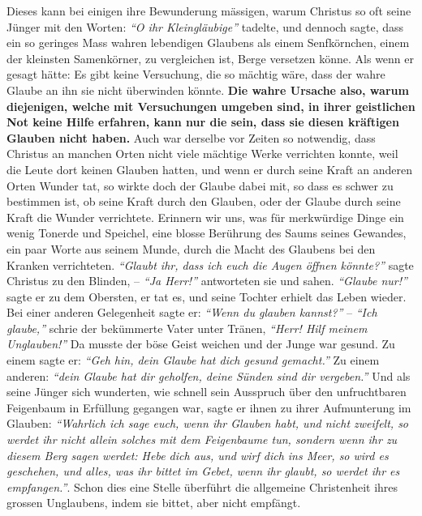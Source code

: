 Dieses kann bei einigen ihre Bewunderung mässigen, warum Christus so oft seine
Jünger mit den Worten:
\textit{"`O ihr Kleingläubige"'} tadelte, und dennoch sagte,
dass ein so geringes Mass wahren lebendigen Glaubens als einem Senfkörnchen,
einem der kleinsten Samenkörner, zu vergleichen ist, Berge versetzen könne. Als
wenn er gesagt hätte: Es gibt keine Versuchung, die so mächtig wäre, dass der
wahre Glaube an ihn sie nicht überwinden könnte. \textbf{Die wahre Ursache also,
warum
diejenigen, welche mit Versuchungen umgeben sind, in ihrer geistlichen Not
keine Hilfe erfahren, kann nur die sein, dass sie diesen kräftigen Glauben nicht
haben.} Auch war derselbe vor Zeiten so notwendig,
dass Christus an manchen
Orten nicht viele mächtige Werke verrichten konnte, weil die Leute dort
keinen Glauben hatten, und wenn er durch seine Kraft an anderen Orten Wunder
tat, so wirkte doch der Glaube dabei mit, so dass es schwer zu bestimmen ist,
ob seine Kraft durch den Glauben, oder der Glaube durch seine Kraft die Wunder
verrichtete. Erinnern wir uns, was für merkwürdige Dinge ein wenig Tonerde und
Speichel, eine blosse Berührung des Saums seines Gewandes, ein paar Worte aus
seinem Munde, durch die Macht des Glaubens bei den Kranken
verrichteten.
\textit{"`Glaubt ihr, dass ich euch die
Augen öffnen könnte?"'} sagte Christus zu den Blinden, -- \textit{"`Ja Herr!"'}
antworteten
sie und sahen.
\textit{"`Glaube nur!"'} sagte er zu dem
Obersten, er tat es, und seine Tochter erhielt das Leben wieder.
Bei einer anderen Gelegenheit sagte er:
\textit{"`Wenn du glauben kannst?"'} --
\textit{"`Ich glaube,"'} schrie der bekümmerte Vater unter Tränen,
\textit{"`Herr! Hilf meinem Unglauben!"'}
Da musste der böse Geist weichen und der
Junge war gesund. Zu einem sagte er:
\textit{"`Geh hin, dein Glaube hat dich gesund gemacht."'}
Zu einem anderen: \textit{"`dein Glaube hat dir
geholfen, deine Sünden sind dir vergeben."'}
Und als seine
Jünger sich wunderten, wie schnell sein Ausspruch über den unfruchtbaren
Feigenbaum in Erfüllung gegangen war, sagte er ihnen zu ihrer Aufmunterung im
Glauben:
\textit{"`Wahrlich ich sage euch, wenn ihr Glauben habt, und nicht zweifelt,
so werdet ihr nicht allein solches mit dem Feigenbaume tun, sondern wenn ihr zu
diesem Berg sagen werdet: Hebe dich aus, und wirf dich ins Meer, so wird es
geschehen, und alles, was ihr bittet im Gebet, wenn ihr glaubt, so werdet ihr
es empfangen."'}. Schon dies eine Stelle überführt die
allgemeine Christenheit ihres grossen
Unglaubens, indem sie bittet, aber nicht
empfängt.

